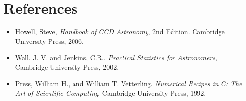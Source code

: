 \documentclass[authoryear, 12pt,5p, times]{elsarticle}
\begin{document}
 \section{References}
%
\begin{itemize}
\item Howell, Steve,  \textit{Handbook of CCD Astronomy}, 2nd Edition. Cambridge University Press, 2006.
\item Wall, J. V. and Jenkins, C.R., \textit{Practical Statistics for Astronomers}, Cambridge University Press, 2002.
\item Press, William H., and William T. Vetterling. \textit{Numerical Recipes in C: The Art of Scientific Computing}. Cambridge University Press, 1992. 
\end{itemize}
\end{document}
